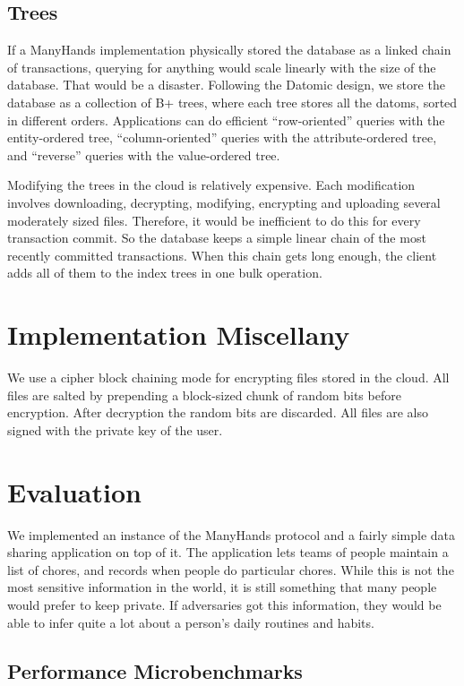 \documentclass[pldi-cameraready,10pt]{sigplanconf-pldi16}
\begin{document}
\subsection{Trees}

If a ManyHands implementation physically stored the database as a linked chain of transactions, querying for anything would scale linearly with the size of the database.
That would be a disaster.
Following the Datomic design, we store the database as a collection of B+ trees, where each tree stores all the datoms, sorted in different orders.
Applications can do efficient ``row-oriented'' queries with the entity-ordered tree, ``column-oriented'' queries with the attribute-ordered tree, and ``reverse'' queries with the value-ordered tree.

Modifying the trees in the cloud is relatively expensive.
Each modification involves downloading, decrypting, modifying, encrypting and uploading several moderately sized files.
Therefore, it would be inefficient to do this for every transaction commit.
So the database keeps a simple linear chain of the most recently committed transactions.
When this chain gets long enough, the client adds all of them to the index trees in one bulk operation.

\section{Implementation Miscellany}

We use a cipher block chaining mode for encrypting files stored in the cloud.
All files are salted by prepending a block-sized chunk of random bits before encryption.
After decryption the random bits are discarded.
All files are also signed with the private key of the user.

\section{Evaluation}

We implemented an instance of the ManyHands protocol and a fairly simple data sharing application on top of it.
The application lets teams of people maintain a list of chores, and records when people do particular chores.
While this is not the most sensitive information in the world, it is still something that many people would prefer to keep private.
If adversaries got this information, they would be able to infer quite a lot about a person's daily routines and habits.

\subsection{Performance Microbenchmarks}
\end{document}
